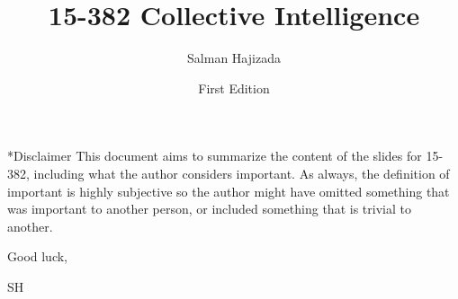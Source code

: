 \documentclass{report}
\title{15-382 Collective Intelligence}
\date{First Edition}
\author{Salman Hajizada}
\makeatletter
\def\chapter{\@ifstar\@schapter\@chapter}
\def\@chapter#1{%
  \refstepcounter{chapter}%
  \addcontentsline{toc}{chapter}{\protect\numberline{\thechapter}#1}%
  \chaptermark{#1}%
  {\par\vspace{2em}\centering\LARGE\bfseries
   \textcolor{chaptergreen}{Chapter \thechapter\\#1}\par\vspace{1em}}%
}
\def\@schapter#1{%
  {\par\vspace{1em}\centering\LARGE\bfseries
   \textcolor{chaptergreen}{#1}\par\vspace{1em}}%
}
\makeatother
\begin{document}
\maketitle

\chapter*{Disclaimer}
This document aims to summarize the content of the slides for 15-382, including
what the author considers important. As always, the definition of important is
highly subjective so the author might have omitted something that was
important to another person, or included something that is trivial to another.


Good luck,

SH









\end{document}
